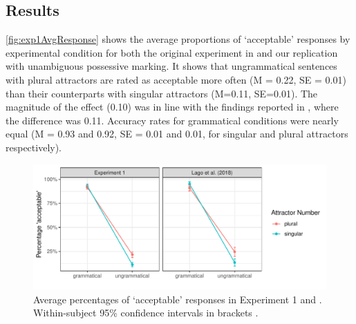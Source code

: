 \documentclass[doc,a4paper,man,natbib,floatsintext,noextraspace]{apa6}\usepackage[]{graphicx}\usepackage[]{color}
\makeatletter
\def\maxwidth{ %
  \ifdim\Gin@nat@width>\linewidth
    \linewidth
  \else
    \Gin@nat@width
  \fi
}
\newenvironment{knitrout}{}{} %
\makeatother
\begin{document}
\subsection{Results} \label{sec:exp1:results}






\autoref{fig:exp1AvgResponse} shows the average proportions of ‘acceptable’ responses by experimental condition for both the original experiment in \citet{LagoEtAl:2018} and our replication with unambiguous possessive marking. 
%
It shows that ungrammatical sentences with plural attractors are rated as acceptable more often
(M = 0.22, 
SE = 0.01) 
than their counterparts with singular attractors 
(M=0.11, 
SE=0.01).
%
%
The magnitude of the effect (0.10) was in line with the findings reported in \citet{LagoEtAl:2018}, where the difference was 0.11.
%
Accuracy rates for grammatical conditions were nearly equal
%
(M = 0.93 and 0.92, SE = 0.01 and 0.01, for singular and plural attractors respectively). 


\begin{knitrout}
\color{fgcolor}\begin{figure}

{\centering \includegraphics[width=\maxwidth]{figure/exp1AvgResponse-1} 

}

\caption{Average percentages of `acceptable' responses in Experiment 1 and \citet{LagoEtAl:2018}. Within-subject 95\% confidence intervals in brackets \cite{Cousineau:2005,Morey:2008}.}\label{fig:exp1AvgResponse}
\end{figure}


\end{knitrout}
\end{document}
